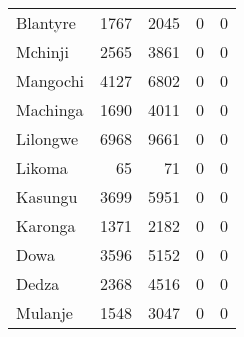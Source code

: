 \begin{tabular}{lrrrr}
Blantyre       &           1767 &           2045 &              0 &              0 \\
Mchinji        &           2565 &           3861 &              0 &              0 \\
Mangochi       &           4127 &           6802 &              0 &              0 \\
Machinga       &           1690 &           4011 &              0 &              0 \\
Lilongwe       &           6968 &           9661 &              0 &              0 \\
Likoma         &             65 &             71 &              0 &              0 \\
Kasungu        &           3699 &           5951 &              0 &              0 \\
Karonga        &           1371 &           2182 &              0 &              0 \\
Dowa           &           3596 &           5152 &              0 &              0 \\
Dedza          &           2368 &           4516 &              0 &              0 \\
Mulanje        &           1548 &           3047 &              0 &              0 \\
\bottomrule
\end{tabular}
